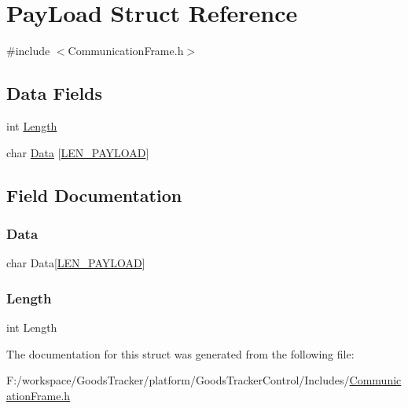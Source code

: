 \hypertarget{struct_pay_load}{}\section{Pay\+Load Struct Reference}
\label{struct_pay_load}


{\ttfamily \#include $<$Communication\+Frame.\+h$>$}

\subsection*{Data Fields}
\begin{DoxyCompactItemize}
\item 
int \hyperlink{struct_pay_load_a9fde862c8bc443d7a6872a487ec265a3}{Length}
\item 
char \hyperlink{struct_pay_load_a951f108a9450168a7cbaa8a3977fc942}{Data} \mbox{[}\hyperlink{_communication_frame_8h_a84c71558ca9ad31a57ae55548f52a6cf}{L\+E\+N\+\_\+\+P\+A\+Y\+L\+O\+AD}\mbox{]}
\end{DoxyCompactItemize}


\subsection{Field Documentation}
\mbox{\label{struct_pay_load_a951f108a9450168a7cbaa8a3977fc942}} 
\subsubsection{\texorpdfstring{Data}{Data}}
{\footnotesize\ttfamily char Data\mbox{[}\hyperlink{_communication_frame_8h_a84c71558ca9ad31a57ae55548f52a6cf}{L\+E\+N\+\_\+\+P\+A\+Y\+L\+O\+AD}\mbox{]}}

\mbox{\label{struct_pay_load_a9fde862c8bc443d7a6872a487ec265a3}} 
\subsubsection{\texorpdfstring{Length}{Length}}
{\footnotesize\ttfamily int Length}



The documentation for this struct was generated from the following file\+:\begin{DoxyCompactItemize}
\item 
F\+:/workspace/\+Goods\+Tracker/platform/\+Goods\+Tracker\+Control/\+Includes/\hyperlink{_communication_frame_8h}{Communication\+Frame.\+h}\end{DoxyCompactItemize}
